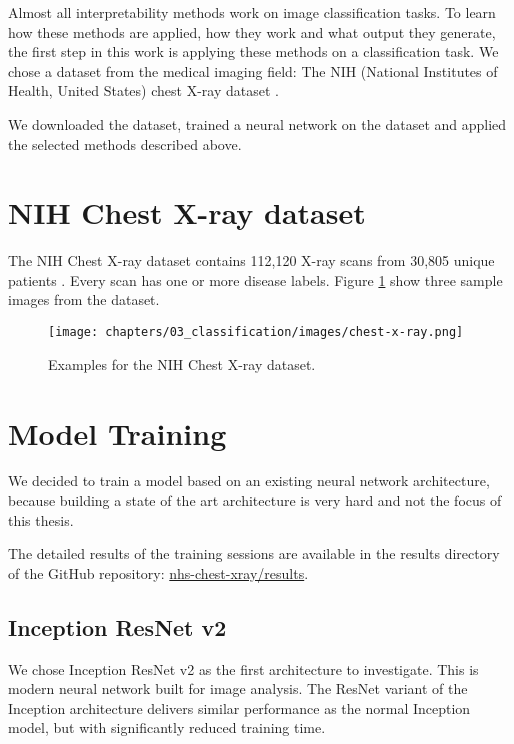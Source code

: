 Almost all interpretability methods work on image classification tasks. To learn how these methods are applied, how they work and what output they generate, the first step in this work is applying these methods on a classification task. We chose a dataset from the medical imaging field: The NIH (National Institutes of Health, United States) chest X-ray dataset \cite{wang2017chestx}.

We downloaded the dataset, trained a neural network on the dataset and applied the selected methods described above.

\section{NIH Chest X-ray dataset}
The NIH Chest X-ray dataset contains 112,120 X-ray scans from 30,805 unique patients \cite{nihchestxraykaggle}. Every scan has one or more disease labels. Figure \ref{chest_xray_sample} show three sample images from the dataset.

\begin{figure}[h]
\centering
\texttt{[image: chapters/03\_classification/images/chest-x-ray.png]}
\caption{Examples for the NIH Chest X-ray dataset.}
\label{chest_xray_sample}
\end{figure}

\section{Model Training}
We decided to train a model based on an existing neural network architecture, because building a state of the art architecture is very hard and not the focus of this thesis.

The detailed results of the training sessions are available in the results directory of the GitHub repository: \href{https://github.com/andef4/thesis-code/tree/master/nhs-chest-xray/results/}{nhs-chest-xray/results}.

\subsection{Inception ResNet v2}

We chose Inception ResNet v2 \cite{szegedy2017inception} as the first architecture to investigate. This is modern neural network built for image analysis.
The ResNet variant of the Inception architecture delivers similar performance as the normal Inception model, but with significantly reduced training time.

